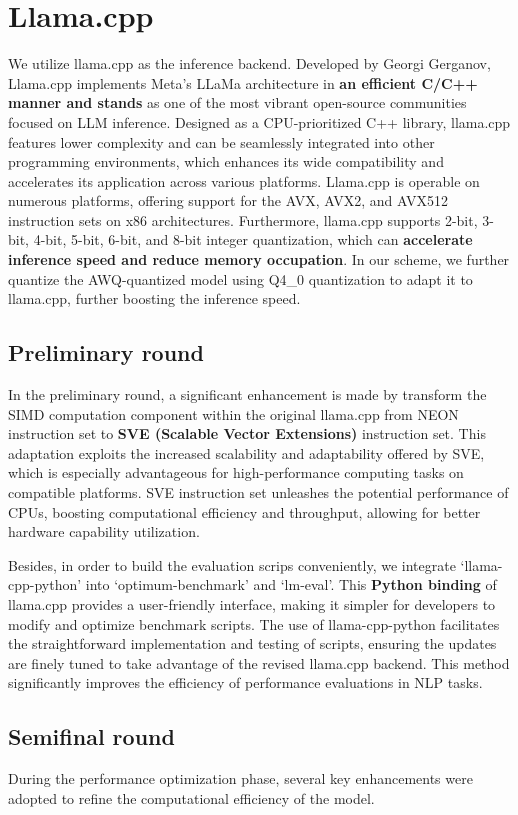 \documentclass[conference]{IEEEtran}
\begin{document}
\section{Llama.cpp}
We utilize llama.cpp as the inference backend. Developed by Georgi Gerganov, Llama.cpp implements Meta's LLaMa architecture in \textbf{an efficient C/C++ manner and stands} as one of the most vibrant open-source communities focused on LLM inference. Designed as a CPU-prioritized C++ library, llama.cpp features lower complexity and can be seamlessly integrated into other programming environments, which enhances its wide compatibility and accelerates its application across various platforms. Llama.cpp is operable on numerous platforms, offering support for the AVX, AVX2, and AVX512 instruction sets on x86 architectures. Furthermore, llama.cpp supports 2-bit, 3-bit, 4-bit, 5-bit, 6-bit, and 8-bit integer quantization, which can \textbf{accelerate inference speed and reduce memory occupation}. In our scheme, we further quantize the AWQ-quantized model using Q4\_0 quantization to adapt it to llama.cpp, further boosting the inference speed.

\subsection{Preliminary round}
In the preliminary round, a significant enhancement is made by transform the SIMD computation component within the original llama.cpp from NEON instruction set to \textbf{SVE (Scalable Vector Extensions)} instruction set. This adaptation exploits the increased scalability and adaptability offered by SVE, which is especially advantageous for high-performance computing tasks on compatible platforms. SVE instruction set unleashes the potential performance of CPUs, boosting computational efficiency and throughput, allowing for better hardware capability utilization.

Besides, in order to build the evaluation scrips conveniently, we integrate `llama-cpp-python' into `optimum-benchmark' and `lm-eval'. This \textbf{Python binding} of llama.cpp provides a user-friendly interface, making it simpler for developers to modify and optimize benchmark scripts. The use of llama-cpp-python facilitates the straightforward implementation and testing of scripts, ensuring the updates are finely tuned to take advantage of the revised llama.cpp backend. This method significantly improves the efficiency of performance evaluations in NLP tasks.

\subsection{Semifinal round}
During the performance optimization phase, several key enhancements were adopted to refine the computational efficiency of the model.
\end{document}
